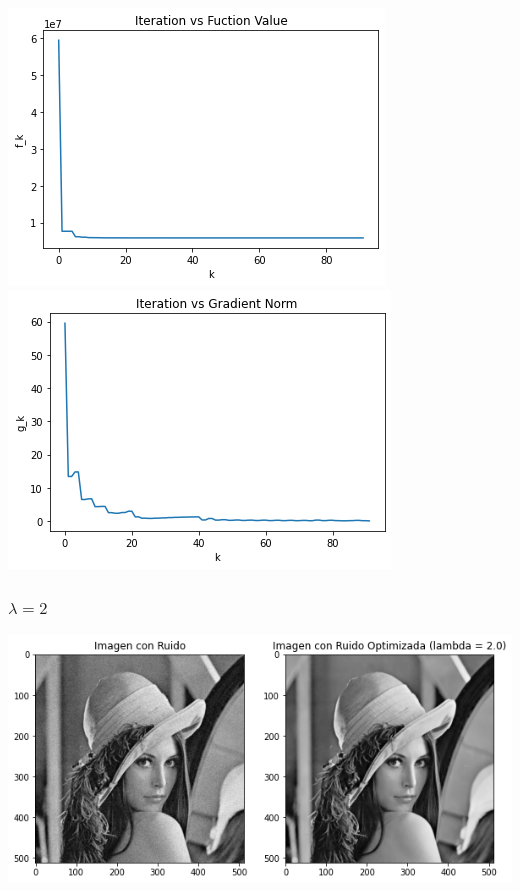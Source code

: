 \documentclass[11pt,letterpaper]{article}
\theoremstyle{definition}
\theoremstyle{definition}
\theoremstyle{definition}
\begin{document}
\begin{center}
	\includegraphics[width=0.6\linewidth]{graficas/pr/funcion_1}
	\includegraphics[width=0.6\linewidth]{graficas/pr/gradiente_1}
\end{center}

\subsubsection{$ \lambda = 2 $}
\begin{center}
	\includegraphics[width=0.75\linewidth]{graficas/pr/optimizada_2}
\end{center}
\end{document}
